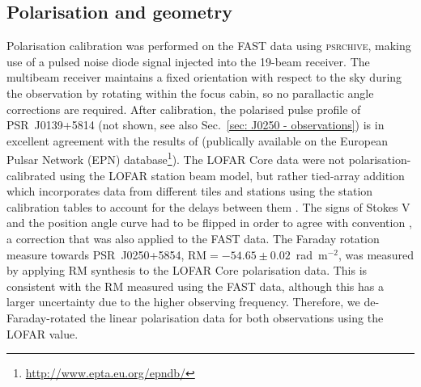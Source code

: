 \subsection{Polarisation and geometry}
\label{sec: J0250 - analysis - polarisation and geometry}

Polarisation calibration was performed on the FAST data using \textsc{psrchive}, making use of a pulsed noise diode signal injected into the 19-beam receiver. The multibeam receiver maintains a fixed orientation with respect to the sky during the observation by rotating within the focus cabin, so no parallactic angle corrections are required. After calibration, the polarised pulse profile of PSR~J0139+5814 (not shown, see also Sec.~\ref{sec: J0250 - observations}) is in excellent agreement with the results of \citet{GLxx1998} (publically available on the European Pulsar Network (EPN) database\footnote{\url{http://www.epta.eu.org/epndb/}}). The LOFAR Core data were not polarisation-calibrated using the LOFAR station beam model, but rather tied-array addition which incorporates data from different tiles and stations using the station calibration tables to account for the delays between them \citep[more detail can be found in ][]{SBG+2019}. The signs of Stokes V and the position angle curve had to be flipped in order to agree with convention \citep[e.g.][]{EWxx2001}, a correction that was also applied to the FAST data. The Faraday rotation measure towards PSR~J0250+5854, $\mathrm{RM}=-54.65\pm0.02$~rad~m$^{-2}$, was measured by applying RM synthesis \citep{BBxx2005} to the LOFAR Core polarisation data. This is consistent with the RM measured using the FAST data, although this has a larger uncertainty due to the higher observing frequency. Therefore, we de-Faraday-rotated the linear polarisation data for both observations using the LOFAR value.

